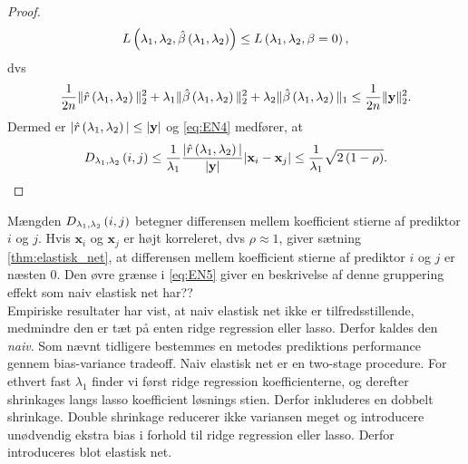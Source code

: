 \begin{proof}
\begin{align*}
L \del{\lambda_1,\lambda_2, \hat{\beta}\del{\lambda_1, \lambda_2}} \leq L \del{\lambda_1,\lambda_2, \beta = 0},  
\end{align*}
dvs
\begin{align*}
\frac{1}{2n} \Vert \hat{r} \del{\lambda_1, \lambda_2} \Vert_2^2 + \lambda_1 \Vert \hat{\beta} \del{\lambda_1, \lambda_2} \Vert_2^2 + \lambda_2 \Vert \hat{\beta} \del{\lambda_1, \lambda_2} \Vert_1 \leq \frac{1}{2n} \Vert \y \Vert_2^2.  
\end{align*}
Dermed er \(\vert \hat{r} \del{\lambda_1, \lambda_2} \vert \leq \vert \y \vert\) og \eqref{eq:EN4} medfører, at
\begin{align*}
D_{\lambda_1, \lambda_2} \del{i,j} \leq \frac{1}{\lambda_1} \frac{\vert \hat{r} \del{\lambda_1, \lambda_2} \vert}{\vert \y \vert} \vert \mathbf{x}_i - \mathbf{x}_j \vert  \leq \frac{1}{\lambda_1} \sqrt{2 \del{1-\rho}}.
\end{align*}
\end{proof}
Mængden \(D_{\lambda_1, \lambda_2} \del{i,j}\) betegner differensen mellem koefficient stierne af prediktor \(i\) og \(j\).
Hvis \(\mathbf{x}_i\) og \(\mathbf{x}_j\) er højt korreleret, dvs \(\rho \approx 1\), giver sætning \ref{thm:elastisk_net}, at differensen mellem koefficient stierne af prediktor \(i\) og \(j\) er næsten 0.
Den øvre grænse i \eqref{eq:EN5} giver en beskrivelse af denne gruppering effekt som naiv elastisk net har??\\[4mm]
%
Empiriske resultater har vist, at naiv elastisk net ikke er tilfredsstillende, medmindre den er tæt på enten ridge regression eller lasso.
Derfor kaldes den \textit{naiv}.
Som nævnt tidligere bestemmes en metodes prediktions performance gennem bias-variance tradeoff. 
Naiv elastisk net er en two-stage procedure. For ethvert fast \(\lambda_1\) finder vi først ridge regression koefficienterne, og derefter shrinkages langs lasso koefficient løsnings stien. Derfor inkluderes en dobbelt shrinkage.
Double shrinkage reducerer ikke variansen meget og introducere unødvendig ekstra bias i forhold til ridge regression eller lasso.
Derfor introduceres blot elastisk net.

